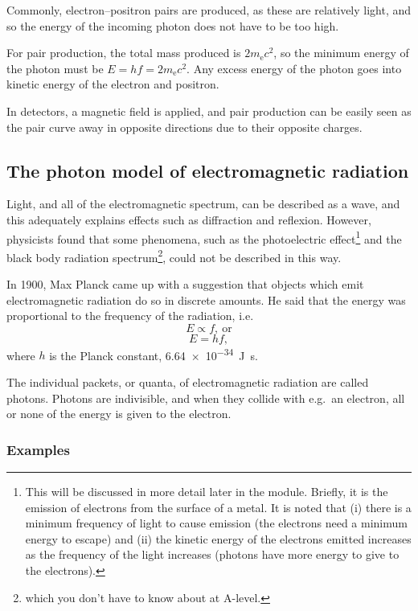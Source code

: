 \documentclass[a4paper,12pt]{article}
\begin{document}
Commonly, electron--positron pairs are produced, as these are relatively light, and so the energy of the incoming photon does not have to be too high.

For pair production, the total mass produced is $2m_{\mathrm{e}}c^{2}$, so the minimum energy of the photon must be $E=hf=2m_{\mathrm{e}}c^{2}$.  Any excess energy of the photon goes into kinetic energy of the electron and positron.

In detectors, a magnetic field is applied, and pair production can be easily seen as the pair curve away in opposite directions due to their opposite charges.

\subsection{The photon model of electromagnetic radiation}

Light, and all of the electromagnetic spectrum, can be described as a wave, and this adequately explains effects such as diffraction and reflexion.  However, physicists found that some phenomena, such as the photoelectric effect\footnote{This will be discussed in more detail later in the module.  Briefly, it is the emission of electrons from the surface of a metal.  It is noted that (i) there is a minimum frequency of light to cause emission (the electrons need a minimum energy to escape) and (ii) the kinetic energy of the electrons emitted increases as the frequency of the light increases (photons have more energy to give to the electrons).} and the black body radiation spectrum\footnote{which you don't have to know about at A-level.}, could not be described in this way.

In 1900, Max Planck came up with a suggestion that objects which emit electromagnetic radiation do so in discrete amounts.  He said that the energy was proportional to the frequency of the radiation, i.e.
\[E\propto f,\mathrm{~or}\]
\[E=hf,\]
where $h$ is the Planck constant, \SI{6.64e-34}{J.s}.

The individual packets, or quanta, of electromagnetic radiation are called photons.  Photons are indivisible, and when they collide with e.g.\ an electron, all or none of the energy is given to the electron.

\subsubsection{Examples}
\end{document}
